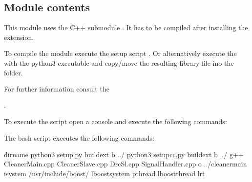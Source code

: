 \documentclass[a4paper,10pt,english]{sphinxmanual}
\begin{document}
\subsection{Module contents}
\label{\detokenize{drc/drc:module-kppc.drc}}\label{\detokenize{drc/drc:module-contents}}
This module uses the C++ submodule {\hyperref[\detokenize{drc/drc:slcleaner}]{}}. It has to be compiled after installing the
extension.

To compile the module execute the setup script .
Or alternatively execute the  with the python3 executable
and copy/move the resulting  library file ino the  folder.

For further information consult the %
\begin{footnote}[4]\sphinxAtStartFootnote
{}
%
\end{footnote}.

To execute the script open a console and execute the following commands:

\begin{sphinxVerbatim}[commandchars=\\\{\}]
\end{sphinxVerbatim}

The bash script executes the following commands:

\begin{sphinxVerbatim}[commandchars=\\\{\}]

 dirname 
 
python3 setup.py build\PYGZus{}ext \PYGZhy{}b ../ 
python3 setup\PYGZus{}cc.py build\PYGZus{}ext \PYGZhy{}b ../ 
g++ CleanerMain.cpp CleanerSlave.cpp DrcSl.cpp SignalHandler.cpp \PYGZhy{}o ../cleanermain \PYGZhy{}isystem /usr/include/boost/ \PYGZhy{}lboost\PYGZus{}system \PYGZhy{}pthread \PYGZhy{}lboost\PYGZus{}thread \PYGZhy{}lrt

\end{sphinxVerbatim}
\end{document}
